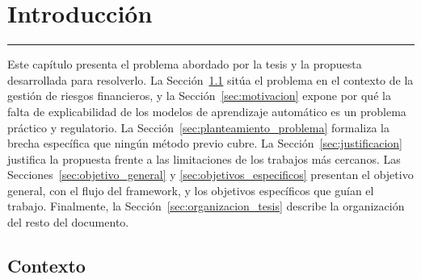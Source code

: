 \chapter{Introducción}
\hrule \bigskip \vspace*{1cm}

\label{sec:introduccion}

Este capítulo presenta el problema abordado por la tesis y la propuesta desarrollada para resolverlo. La Sección~\ref{sec:contexto} sitúa el problema en el contexto de la gestión de riesgos financieros, y la Sección~\ref{sec:motivacion} expone por qué la falta de explicabilidad de los modelos de aprendizaje automático es un problema práctico y regulatorio. La Sección~\ref{sec:planteamiento_problema} formaliza la brecha específica que ningún método previo cubre. La Sección~\ref{sec:justificacion} justifica la propuesta frente a las limitaciones de los trabajos más cercanos. Las Secciones~\ref{sec:objetivo_general} y \ref{sec:objetivos_especificos} presentan el objetivo general, con el flujo del framework, y los objetivos específicos que guían el trabajo. Finalmente, la Sección~\ref{sec:organizacion_tesis} describe la organización del resto del documento.

\section{Contexto}
\label{sec:contexto}

